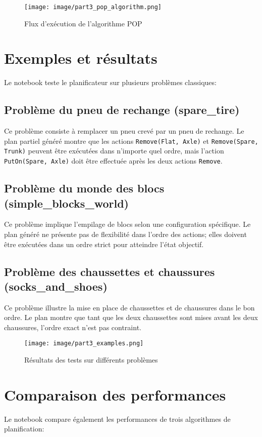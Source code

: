 \documentclass[a4paper,12pt]{report}
\begin{document}
\begin{figure}[H]
    \centering
    \texttt{[image: image/part3\_pop\_algorithm.png]}
    \caption{Flux d'exécution de l'algorithme POP}
\end{figure}

\section{Exemples et résultats}
Le notebook teste le planificateur sur plusieurs problèmes classiques:

\subsection{Problème du pneu de rechange (spare\_tire)}
Ce problème consiste à remplacer un pneu crevé par un pneu de rechange. Le plan partiel généré montre que les actions \texttt{Remove(Flat, Axle)} et \texttt{Remove(Spare, Trunk)} peuvent être exécutées dans n'importe quel ordre, mais l'action \texttt{PutOn(Spare, Axle)} doit être effectuée après les deux actions \texttt{Remove}.

\subsection{Problème du monde des blocs (simple\_blocks\_world)}
Ce problème implique l'empilage de blocs selon une configuration spécifique. Le plan généré ne présente pas de flexibilité dans l'ordre des actions; elles doivent être exécutées dans un ordre strict pour atteindre l'état objectif.

\subsection{Problème des chaussettes et chaussures (socks\_and\_shoes)}
Ce problème illustre la mise en place de chaussettes et de chaussures dans le bon ordre. Le plan montre que tant que les deux chaussettes sont mises avant les deux chaussures, l'ordre exact n'est pas contraint.

\begin{figure}[H]
    \centering
    \texttt{[image: image/part3\_examples.png]}
    \caption{Résultats des tests sur différents problèmes}
\end{figure}

\section{Comparaison des performances}
Le notebook compare également les performances de trois algorithmes de planification:
\end{document}
